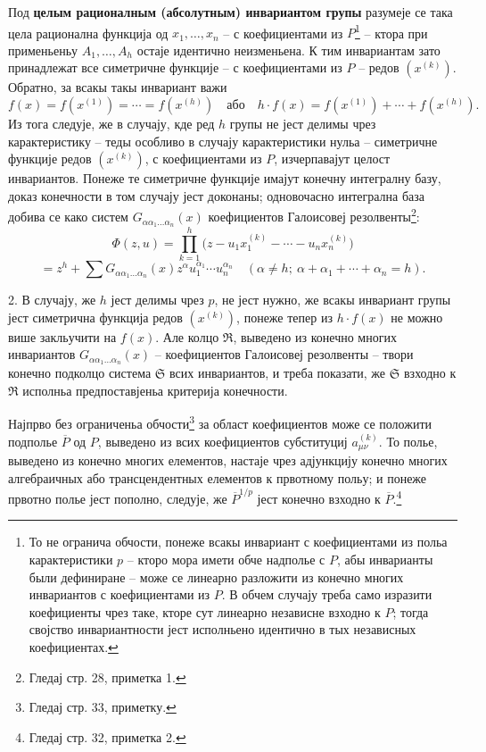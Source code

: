 ﻿\documentclass[11pt]{article}
\begin{document}
Под \textbf{целым рационалным (абсолутным) инвариантом групы} разумеје се така цела рационална функција од $x_1,\ldots,x_n$ -- с коефициентами из $P$\footnote{То не огранича обчости, понеже всакы инвариант с коефициентами из польа карактеристики $p$ -- кторо мора имети обче надполье с $P$, абы инварианты были дефиниране -- може се линеарно разложити из конечно многих инвариантов с коефициентами из $P$. В обчем случају треба само изразити коефициенты чрез таке, кторе сут линеарно независне взходно к $P$; тогда својство инвариантности јест исполньено идентично в тых независных коефициентах.} -- ктора при применьеньу $A_1,\ldots,A_h$ остаје идентично неизменьена. К тим инвариантам зато принадлежат все симетричне функције -- с коефициентами из $P$ -- редов $(x^{(k)})$. Обратно, за всакы такы инвариант важи
\[
 f(x)=f(x^{(1)})=\cdots=f(x^{(h)})
 \quad\text{або}\quad
 h\cdot f(x)=f(x^{(1)})+\cdots+f(x^{(h)}).
\]
Из тога следује, же в случају, кде ред $h$ групы не јест делимы чрез карактеристику -- теды особливо в случају карактеристики нульа -- симетричне функције редов $(x^{(k)})$, с коефициентами из $P$, изчерпавајут целост инвариантов. Понеже те симетричне функције имајут конечну интегралну базу, доказ конечности в том случају јест доконаны; одновочасно интегрална база добива се како систем $G_{\alpha\alpha_1\ldots\alpha_n}(x)$ коефициентов Галоисовеј резолвенты\footnote{Гледај стр. 28, приметка 1.}:
\[
 \Phi(z,u)=\prod_{k=1}^{h}\bigl(z-u_1x_1^{(k)}-\cdots-u_nx_n^{(k)}\bigr)
\]
\[
 =z^h+\sum G_{\alpha\alpha_1\ldots\alpha_n}(x)
 z^{\alpha}u_1^{\alpha_1}\cdots u_n^{\alpha_n}
 \quad(\alpha\ne h;\ \alpha+\alpha_1+\cdots+\alpha_n=h).
\]

2. В случају, же $h$ јест делимы чрез $p$, не јест нужно, же всакы инвариант групы јест симетрична функција редов $(x^{(k)})$, понеже тепер из $h\cdot f(x)$ не можно више закльучити на $f(x)$. Але колцо $\mathfrak R$, выведено из конечно многих инвариантов $G_{\alpha\alpha_1\ldots\alpha_n}(x)$ -- коефициентов Галоисовеј резолвенты -- твори конечно подколцо система $\mathfrak S$ всих инвариантов, и треба показати, же $\mathfrak S$ взходно к $\mathfrak R$ исполньа предпоставјеньа критерија конечности.

Најпрво без ограниченьа обчости\footnote{Гледај стр. 33, приметку.} за област коефициентов може се положити подполье $\overline P$ од $P$, выведено из всих коефициентов субституциј $a_{\mu\nu}^{(k)}$. То полье, выведено из конечно многих елементов, настаје чрез адјункцију конечно многих алгебраичных або трансцендентных елементов к првотному польу; и понеже првотно полье јест пополно, следује, же $\overline P^{1/p}$ јест конечно взходно к $\overline P$.\footnote{Гледај стр. 32, приметка 2.}
\end{document}
